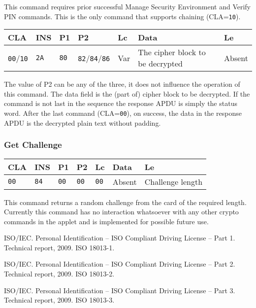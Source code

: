 \documentclass{article}
\begin{document}
This command requires prior successful Manage Security Environment and Verify PIN commands.
This is the only command that supports chaining (CLA=\texttt{10}).
\begin{flushleft}
\begin{tabular}{|l|l|l|l|l|l|l|}
\hline
CLA & INS & P1 & P2 & Lc & Data & Le \\
\hline
\texttt{00}/\texttt{10} & \texttt{2A} & \texttt{80} & \texttt{82}/\texttt{84}/\texttt{86} &
Var & The cipher block to be decrypted & Absent \\
\hline
\end{tabular}
\end{flushleft}
The value of P2 can be any of the three, it does not influence the operation of this command.
The data field is the (part of) cipher block to be decrypted.
If the command is not last in the sequence the response APDU is simply the status word.
After the last command (CLA=\texttt{00}), on success,
the data in the response APDU is the decrypted plain text without padding.

\subsubsection{Get Challenge}

\begin{flushleft}
\begin{tabular}{|l|l|l|l|l|l|l|}
\hline
CLA & INS & P1 & P2 & Lc & Data & Le \\
\hline
\texttt{00} & \texttt{84} & \texttt{00} & \texttt{00} &
\texttt{00} & Absent & Challenge length \\
\hline
\end{tabular}
\end{flushleft}
This command returns a random challenge from the card of the required length. Currently this command
has no interaction whatsoever with any other crypto commands in the applet and is implemented for 
possible future use.

\begin{thebibliography}{1}
 ISO/IEC.  \newblock Personal Identification -- ISO
  Compliant Driving License -- Part 1.  \newblock Technical report,
  2009.  \newblock ISO 18013-1.

 ISO/IEC.  \newblock Personal Identification -- ISO
  Compliant Driving License -- Part 2.  \newblock Technical report,
  2009.  \newblock ISO 18013-2.

 ISO/IEC.  \newblock Personal Identification -- ISO
  Compliant Driving License -- Part 3.  \newblock Technical report,
  2009.  \newblock ISO 18013-3.

\end{thebibliography}
\end{document}
